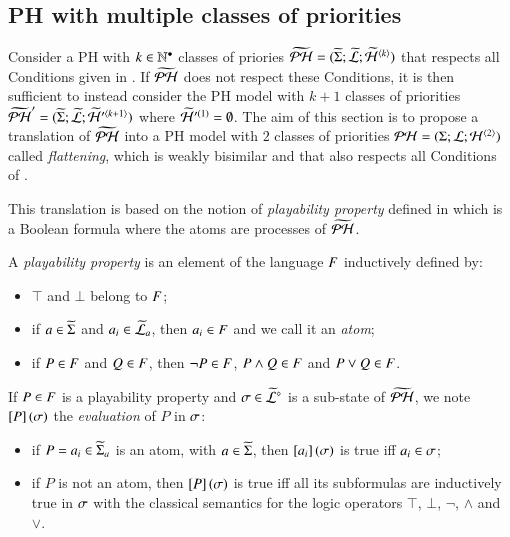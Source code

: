 \subsection{PH with multiple classes of priorities}
\label{ssec:flattening}


Consider a PH with $k \in \mathbb{N}^\bullet$ classes of priories
$\widetilde{\mathcal{PH}} = (\widetilde{\Sigma}; \widetilde{\mathcal{L}}; \widetilde{\mathcal{H}}^{{\langle k \rangle}})$
that respects all Conditions given in .
If $\widetilde{\mathcal{PH}}$ does not respect these Conditions,
it is then sufficient to instead consider the PH model with $k+1$ classes of priorities
$\widetilde{\mathcal{PH}}' = (\widetilde{\Sigma}; \widetilde{\mathcal{L}}; \widetilde{\mathcal{H}}'^{{\langle k+1 \rangle}})$
where $\widetilde{\mathcal{H}}'^{(1)} = \emptyset$.
The aim of this section is to propose a translation of $\widetilde{\mathcal{PH}}$
into a PH model with $2$ classes of priorities $\mathcal{PH} = (\Sigma; \mathcal{L}; \mathcal{H}^{{\langle 2 \rangle}})$
called \emph{flattening},
which is weakly bisimilar
and that also respects all Conditions of .

This translation is based on the notion of \emph{playability property} defined in 
which is a Boolean formula where the atoms are processes of $\widetilde{\mathcal{PH}}$.

\begin{definition}
  \label{def:pp}
  A \emph{playability property} is an element of the language $F$ inductively defined by:
  \begin{itemize}
    \item $\top$ and $\bot$ belong to $F$;
    \item if $a \in \widetilde{\Sigma}$ and $a_i \in \widetilde{\mathcal{L}}_a$, then $a_i \in F$ and we call it an \emph{atom};
    \item if $P \in F$ and $Q \in F$, then $\neg P \in F$, $P \wedge Q \in F$ and $P \vee Q \in F$.
  \end{itemize}
  If $P \in F$ is a playability property and $\sigma \in \widetilde{\mathcal{L}}^\diamond$ is a sub-state of $\widetilde{\mathcal{PH}}$,
  we note $\left[P\right](\sigma)$ the \emph{evaluation} of $P$ in $\sigma$:
  \begin{itemize}
    \item if $P = a_i \in \widetilde{\Sigma}_a$ is an atom, with $a \in \widetilde{\Sigma}$, then $\left[a_i\right](\sigma)$ is true iff $a_i \in \sigma$;
    \item if $P$ is not an atom, then $\left[P\right](\sigma)$ is true iff all its subformulas are inductively true in $\sigma$
      with the classical semantics for the logic operators $\top$, $\bot$, $\neg$, $\wedge$ and $\vee$.
  \end{itemize}
\end{definition}

